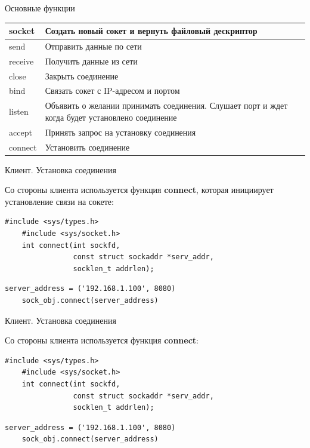 \begin{frame}{Основные функции}
    \begin{center}
        \begin{tabular}{| m{5em} | m{22em}|}
            \hline
            socket  & Создать новый сокет и вернуть файловый дескриптор \\
            \hline
            send    & Отправить данные по сети \\
            \hline
            receive & Получить данные из сети \\
            \hline
            close   & Закрыть соединение \\
            \hline
            bind    & Связать сокет с IP-адресом и портом \\
            \hline
            listen  & Объявить о желании принимать соединения. Слушает порт и
                        ждет когда будет установлено соединение \\
            \hline
            accept  & Принять запрос на установку соединения \\
            \hline
            connect & Установить соединение  \\
            \hline
        \end{tabular}
    \end{center}
\end{frame}

\begin{frame}[fragile]{Клиент. Установка соединения}

    Со стороны клиента используется функция \textbf{connect}, которая
    инициирует установление связи на сокете:

    \begin{lstlisting}[style=cpp, caption=Си]
    #include <sys/types.h>
    #include <sys/socket.h>
    int connect(int sockfd,
                const struct sockaddr *serv_addr,
                socklen_t addrlen);
    \end{lstlisting}

    \begin{lstlisting}[style=python, caption=Python]
    server_address = ('192.168.1.100', 8080)
    sock_obj.connect(server_address)
    \end{lstlisting}
\end{frame}

\begin{frame}[fragile]{Клиент. Установка соединения}

    Со стороны клиента используется функция \textbf{connect}:

    \begin{lstlisting}[style=cpp, caption=Си]
    #include <sys/types.h>
    #include <sys/socket.h>
    int connect(int sockfd,
                const struct sockaddr *serv_addr,
                socklen_t addrlen);
    \end{lstlisting}

    \begin{lstlisting}[style=python, caption=Python]
    server_address = ('192.168.1.100', 8080)
    sock_obj.connect(server_address)
    \end{lstlisting}
\end{frame}

